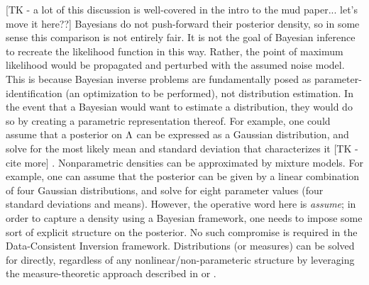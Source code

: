 \begin{ex}
[TK - a lot of this discussion is well-covered in the intro to the mud paper... let's move it here??]
Bayesians do not push-forward their posterior density, so in some sense this comparison is not entirely fair.
It is not the goal of Bayesian inference to recreate the likelihood function in this way.
Rather, the point of maximum likelihood would be propagated and perturbed with the assumed noise model.
This is because Bayesian inverse problems are fundamentally posed as parameter-identification (an optimization to be performed), not distribution estimation.
In the event that a Bayesian would want to estimate a distribution, they would do so by creating a parametric representation thereof.
For example, one could assume that a posterior on ${\Lambda}$ can be expressed as a Gaussian distribution, and solve for the most likely mean and standard deviation that characterizes it [TK - cite more] \cite{Smith}.
Nonparametric densities can be approximated by mixture models.
For example, one can assume that the posterior can be given by a linear combination of four Gaussian distributions, and solve for eight parameter values (four standard deviations and means).
However, the operative word here is \emph{assume}; in order to capture a density using a Bayesian framework, one needs to impose some sort of explicit structure on the posterior.
No such compromise is required in the Data-Consistent Inversion framework.
Distributions (or measures) can be solved for directly, regardless of any nonlinear/non-parameteric structure by leveraging the measure-theoretic approach described in \cite{BE13} or \cite{BJW18}.

\end{ex}
